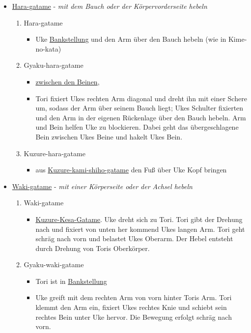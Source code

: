 \documentclass[justified, a4paper, notitlepage, captions=tableheading, nobib]{tufte-handout}
\begin{document}
\begin{itemize}
\item \hyperref[org191f929]{Hara-gatame} - \emph{mit dem Bauch oder der Körpervorderseite hebeln}

\begin{enumerate}
\item \label{org191f929}Hara-gatame 
\begin{itemize}
\item Uke \hyperref[orgd4877a8]{Bankstellung} und den Arm über den Bauch hebeln (wie in Kime-no-kata)
\end{itemize}
\item \label{org242084b}Gyaku-hara-gatame
\begin{itemize}
\item \hyperref[org9bede9d]{zwischen den Beinen},
\item Tori fixiert Ukes rechten Arm diagonal und dreht ihn mit einer Schere um, sodass der Arm über seinem Bauch liegt; Ukes Schulter fixierten und den Arm in der eigenen Rückenlage über den Bauch hebeln. Arm und Bein helfen Uke zu blockieren. Dabei geht das übergeschlagene Bein zwischen Ukes Beine und hakelt Ukes Bein.
\end{itemize}
\item \label{orgaca2f76}Kuzure-hara-gatame 
\begin{itemize}
\item aus \hyperref[org35f5762]{Kuzure-kami-shiho-gatame} den Fuß über Uke Kopf bringen
\end{itemize}
\end{enumerate}

\item \hyperref[org34d84f8]{Waki-gatame} - \emph{mit einer Körperseite oder der Achsel hebeln}

\begin{enumerate}
\item \label{org34d84f8}Waki-gatame
\begin{itemize}
\item \hyperref[org9725a6e]{Kuzure-Kesa-Gatame}. Uke dreht sich zu Tori. Tori gibt der Drehung nach und fixiert von unten her kommend Ukes langen Arm. Tori geht schräg nach vorn und belastet Ukes Oberarm. Der Hebel entsteht durch Drehung von Toris Oberkörper.
\end{itemize}
\item \label{org96343f4}Gyaku-waki-gatame 
\begin{itemize}
\item Tori ist in \hyperref[orgd4877a8]{Bankstellung}
\item Uke greift mit dem rechten Arm von vorn hinter Toris Arm. Tori klemmt den Arm ein, fixiert Ukes rechtes Knie und schiebt sein rechtes Bein unter Uke hervor. Die Bewegung erfolgt schräg nach vorn.
\end{itemize}
\end{enumerate}


\end{itemize}
\end{document}
